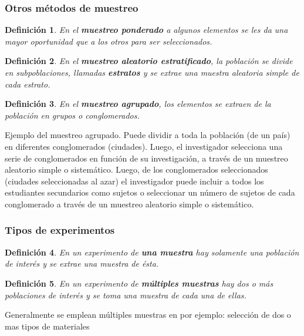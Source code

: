 \documentclass[10pt,a4paper]{book}
\newtheorem{defi}{\textbf{Definición}}
\begin{document}
\subsubsection{Otros métodos de muestreo}
\begin{defi}
	En el \textbf{muestreo ponderado} a algunos elementos se les da una mayor oportunidad que a los otros para ser seleccionados.
\end{defi}
\begin{defi}
	En el \textbf{muestreo aleatorio estratificado}, la población se divide en subpoblaciones, llamadas \textbf{estratos} y se extrae una muestra aleatoria simple de cada estrato.
\end{defi}
\begin{defi}
	En el \textbf{muestreo agrupado}, los elementos se extraen de la población en grupos o conglomerados.
\end{defi}
	
Ejemplo del muestreo agrupado. Puede dividir a toda la población (de un país) en diferentes conglomerados (ciudades). Luego, el investigador selecciona una serie de conglomerados en función de su investigación, a través de un muestreo aleatorio simple o sistemático. Luego, de los conglomerados seleccionados (ciudades seleccionadas al azar) el investigador puede incluir a todos los estudiantes secundarios como sujetos o seleccionar un número de sujetos de cada conglomerado a través de un muestreo aleatorio simple o sistemático.


\subsubsection{Tipos de experimentos}

\begin{defi}
	En un experimento de \textbf{una muestra} hay solamente una población de interés y se extrae una muestra de ésta.
\end{defi}

\begin{defi}
	En un experimento de \textbf{múltiples muestras} hay dos o más poblaciones de interés y se toma una muestra de cada una de ellas. 
\end{defi}

Generalmente se emplean múltiples muestras en por ejemplo: selección de dos o mas tipos de materiales
\end{document}
